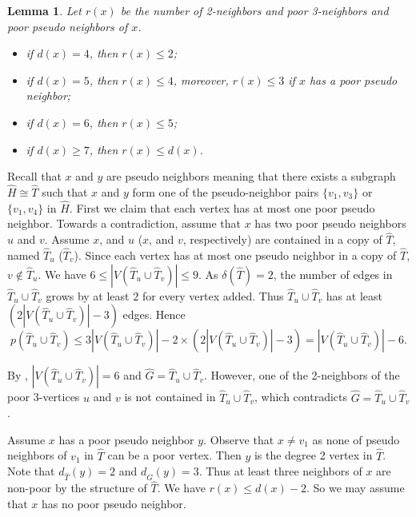 \documentclass[11pt,a4paper]{article}
\makeatletter
\renewenvironment{proof}[1][\proofname]{\par
	\pushQED{\qed}%
	\normalfont \topsep6\p@\@plus6\p@\relax
	\trivlist
	\item[\hskip\labelsep
	\bfseries
	#1\@addpunct{.}]\ignorespaces
}{%
	\popQED\endtrivlist\@endpefalse
}
\newtheorem{lemma}[theorem]{Lemma}
\theoremstyle{definition}
\makeatother
\begin{document}
\begin{lemma} \label{lem:Counting_r(x)}
	Let $r(x)$ be the number of 2-neighbors and poor 3-neighbors and poor pseudo neighbors of $x$.
	\begin{itemize}
		\item if $d(x)=4$, then $r(x)\leq 2$;
		\item if $d(x)=5$, then $r(x)\leq 4$, moreover, $r(x)\leq 3$ if $x$ has a poor pseudo neighbor;
		\item if $d(x)=6$, then $r(x)\leq 5$;
		\item if $d(x)\ge 7$, then $r(x)\leq d(x)$.
\end{itemize}
\end{lemma}

\begin{proof}
	 Recall that $x$ and $y$ are pseudo neighbors meaning that there exists a subgraph $\widehat{H}\cong \widehat{T}$ such that $x$ and $y$ form one of the pseudo-neighbor pairs $\{v_{1},v_{3}\}$ or $\{v_{1},v_{4}\}$ in $\widehat{H}$. First we claim that each vertex has at most one poor pseudo neighbor. Towards a contradiction, assume that $x$ has two poor pseudo neighbors $u$ and $v$. Assume $x$, and $u$ ($x$, and $v$, respectively) are contained in a copy of $\widehat{T}$, named $\widehat{T}_u$ ($\widehat{T}_v$). Since each vertex has at most one pseudo neighbor in a copy of $\widehat{T}$, $v\notin \widehat{T}_u$. 
	We have $6 \leq |V(\widehat{T}_u \cup \widehat{T}_v)| \leq 9$. As $\delta(\widehat{T})=2$, the number of edges in $\widehat{T}_u \cup \widehat{T}_v$ grows by at least $2$ for every vertex added. Thus $\widehat{T}_u\cup \widehat{T}_v$ has at least $(2|V(\widehat{T}_u \cup \widehat{T}_v)|-3)$ edges. Hence
	$$p(\widehat{T}_u \cup \widehat{T}_v)\leq 3|V(\widehat{T}_u \cup \widehat{T}_v)|-2\times(2|V(\widehat{T}_u \cup \widehat{T}_v)|-3)=|V(\widehat{T}_u \cup \widehat{T}_v)|-6.$$
	
	By , $|V(\widehat{T}_u\cup \widehat{T}_v)|=6$ and $\widehat{G}=\widehat{T}_u\cup \widehat{T}_v$. However, one of the 2-neighbors of the poor 3-vertices $u$ and $v$ is not contained in $\widehat{T}_u\cup \widehat{T}_v$, which contradicts $\widehat{G}=\widehat{T}_u\cup \widehat{T}_v$.
	
	Assume $x$ has a poor pseudo neighbor $y$. Observe that $x\neq v_{1}$ as none of pseudo neighbors of $v_{1}$ in $\widehat{T}$ can be a poor vertex. Then $y$ is the degree 2 vertex in $\widehat{T}$. Note that  $d_{\widehat{T}}(y)=2$ and $d_{\widehat{G}}(y)=3$. Thus at least three neighbors of $x$ are non-poor by the structure of $\widehat{T}$. We have $r(x)\leq d(x)-2$. So we may assume that $x$ has no poor pseudo neighbor. 
	

\end{proof}
\end{document}
